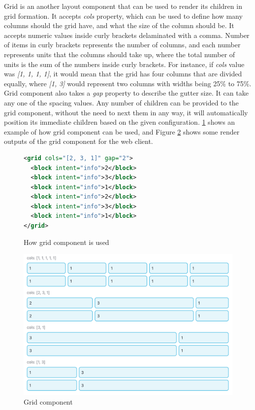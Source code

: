 Grid is an another layout component that can be used to render its children in grid formation. It accepts \textit{cols} property, which can be used to define how many columns should the grid have, and what the size of the column should be. It accepts numeric values inside curly brackets delaminated with a comma. Number of items in curly brackets represents the number of columns, and each number represents units that the columns should take up, where the total number of units is the sum of the numbers inside curly brackets. For instance, if \textit{cols} value was \textit{[1, 1, 1, 1]}, it would mean that the grid has four columns that are divided equally, where \textit{[1, 3]} would represent two columns with widths being 25\% to 75\%. Grid component also takes a \textit{gap} property to describe the gutter size. It can take any one of the spacing values. Any number of children can be provided to the grid component, without the need to next them in any way, it will automatically position its immediate children based on the given configuration. \ref{fig:grid_xml} shows an example of how grid component can be used, and Figure \ref{fig:grid} shows some render outputs of the grid component for the web client.

\begin{figure}
\begin{minipage}{\linewidth}
\begin{lstlisting}[language=xml]
<grid cols="[2, 3, 1]" gap="2">
  <block intent="info">2</block>
  <block intent="info">3</block>
  <block intent="info">1</block>
  <block intent="info">2</block>
  <block intent="info">3</block>
  <block intent="info">1</block>
</grid>
\end{lstlisting}
\end{minipage}
\caption{How grid component is used}%
\label{fig:grid_xml}%
\end{figure}

\begin{figure}
  \centering
  \includegraphics[width=13cm]{thesis/paper/images/grid.png}
  \caption{Grid component}%
  \label{fig:grid}%
\end{figure}

